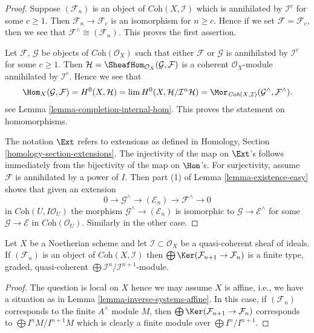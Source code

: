 \begin{proof}
Suppose $(\mathcal{F}_n)$ is an object of $\textit{Coh}(X, \mathcal{I})$
which is annihilated by $\mathcal{I}^c$ for some $c \geq 1$. Then
$\mathcal{F}_n \to \mathcal{F}_c$ is an isomorphism for $n \geq c$.
Hence if we set $\mathcal{F} = \mathcal{F}_c$, then we see that
$\mathcal{F}^\wedge \cong (\mathcal{F}_n)$. This proves the first assertion.

\medskip\noindent
Let $\mathcal{F}$, $\mathcal{G}$ be objects of $\textit{Coh}(\mathcal{O}_X)$
such that either $\mathcal{F}$ or $\mathcal{G}$ is annihilated by
$\mathcal{I}^c$ for some $c \geq 1$. Then
$\mathcal{H} = \SheafHom_{\mathcal{O}_X}(\mathcal{G}, \mathcal{F})$
is a coherent $\mathcal{O}_X$-module annihilated by $\mathcal{I}^c$.
Hence we see that
$$
\Hom_X(\mathcal{G}, \mathcal{F}) =
H^0(X, \mathcal{H}) =
\lim H^0(X, \mathcal{H}/\mathcal{I}^n\mathcal{H}) =
\Mor_{\textit{Coh}(X, \mathcal{I})}
(\mathcal{G}^\wedge, \mathcal{F}^\wedge).
$$
see Lemma \ref{lemma-completion-internal-hom}.
This proves the statement on homomorphisms.

\medskip\noindent
The notation $\Ext$ refers to extensions as defined in
Homology, Section \ref{homology-section-extensions}.
The injectivity of the map on $\Ext$'s follows immediately
from the bijectivity of the map on $\Hom$'s.
For surjectivity, assume $\mathcal{F}$ is annihilated
by a power of $I$. Then part (1) of Lemma \ref{lemma-existence-easy}
shows that given an extension
$$
0 \to \mathcal{G}^\wedge \to (\mathcal{E}_n) \to \mathcal{F}^\wedge \to 0
$$
in $\textit{Coh}(U, I\mathcal{O}_U)$
the morphism $\mathcal{G}^\wedge \to (\mathcal{E}_n)$ is
isomorphic to $\mathcal{G} \to \mathcal{E}^\wedge$
for some $\mathcal{G} \to \mathcal{E}$ in $\textit{Coh}(\mathcal{O}_U)$.
Similarly in the other case.
\end{proof}

\begin{lemma}
\label{lemma-finite-over-rees-algebra}
Let $X$ be a Noetherian scheme and let $\mathcal{I} \subset \mathcal{O}_X$
be a quasi-coherent sheaf of ideals. If $(\mathcal{F}_n)$ is an object of
$\textit{Coh}(X, \mathcal{I})$ then
$\bigoplus \Ker(\mathcal{F}_{n + 1} \to \mathcal{F}_n)$ is
a finite type, graded, quasi-coherent
$\bigoplus \mathcal{I}^n/\mathcal{I}^{n + 1}$-module.
\end{lemma}

\begin{proof}
The question is local on $X$ hence we may assume $X$ is affine, i.e.,
we have a situation as in Lemma \ref{lemma-inverse-systems-affine}.
In this case, if $(\mathcal{F}_n)$ corresponds to the finite $A^\wedge$
module $M$, then $\bigoplus \Ker(\mathcal{F}_{n + 1} \to \mathcal{F}_n)$
corresponds to $\bigoplus I^nM/I^{n + 1}M$ which is clearly a finite
module over $\bigoplus I^n/I^{n + 1}$.
\end{proof}

